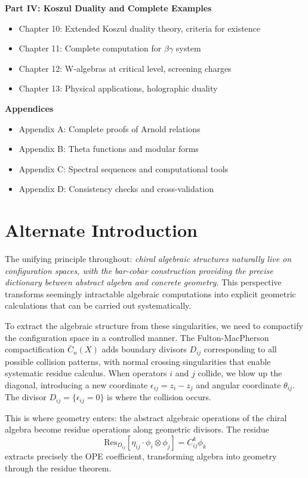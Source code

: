 \textbf{Part IV: Koszul Duality and Complete Examples}
\begin{itemize}
\item Chapter 10: Extended Koszul duality theory, criteria for existence
\item Chapter 11: Complete computation for $\beta\gamma$ system
\item Chapter 12: W-algebras at critical level, screening charges
\item Chapter 13: Physical applications, holographic duality
\end{itemize}

\textbf{Appendices}
\begin{itemize}
\item Appendix A: Complete proofs of Arnold relations
\item Appendix B: Theta functions and modular forms
\item Appendix C: Spectral sequences and computational tools
\item Appendix D: Consistency checks and cross-validation
\end{itemize}

\chapter{Alternate Introduction}
The unifying principle throughout: \emph{chiral algebraic structures naturally live on configuration spaces, with the bar-cobar construction providing the precise dictionary between abstract algebra and concrete geometry}. This perspective transforms seemingly intractable algebraic computations into explicit geometric calculations that can be carried out systematically.

To extract the algebraic structure from these singularities, we need to compactify the configuration space in a controlled manner. The Fulton-MacPherson compactification $\overline{C}_n(X)$ adds boundary divisors $D_{ij}$ corresponding to all possible collision patterns, with normal crossing singularities that enable systematic residue calculus. When operators $i$ and $j$ collide, we blow up the diagonal, introducing a new coordinate $\epsilon_{ij} = z_i - z_j$ and angular coordinate $\theta_{ij}$. The divisor $D_{ij} = \{\epsilon_{ij} = 0\}$ is where the collision occurs.

This is where geometry enters: the abstract algebraic operations of the chiral algebra become residue operations along geometric divisors. The residue
$$\text{Res}_{D_{ij}}[\eta_{ij} \cdot \phi_i \otimes \phi_j] = C^k_{ij} \phi_k$$
extracts precisely the OPE coefficient, transforming algebra into geometry through the residue theorem.

